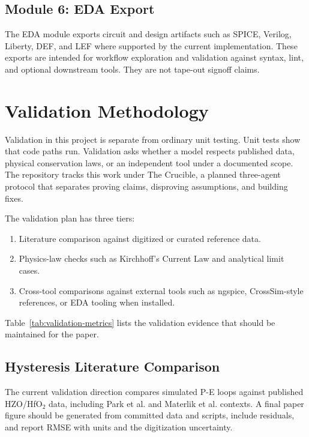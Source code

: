 \documentclass[11pt]{article}
\begin{document}
\subsection{Module 6: EDA Export}

The EDA module exports circuit and design artifacts such as SPICE, Verilog, Liberty, DEF, and LEF where supported by the current implementation. These exports are intended for workflow exploration and validation against syntax, lint, and optional downstream tools. They are not tape-out signoff claims.

\section{Validation Methodology}

Validation in this project is separate from ordinary unit testing. Unit tests show that code paths run. Validation asks whether a model respects published data, physical conservation laws, or an independent tool under a documented scope. The repository tracks this work under The Crucible, a planned three-agent protocol that separates proving claims, disproving assumptions, and building fixes.

The validation plan has three tiers:

\begin{enumerate}
  \item Literature comparison against digitized or curated reference data.
  \item Physics-law checks such as Kirchhoff's Current Law and analytical limit cases.
  \item Cross-tool comparisons against external tools such as ngspice, CrossSim-style references, or EDA tooling when installed.
\end{enumerate}

Table~\ref{tab:validation-metrics} lists the validation evidence that should be maintained for the paper.



\subsection{Hysteresis Literature Comparison}

The current validation direction compares simulated P-E loops against published HZO/HfO$_2$ data, including Park et al. \citep{park2015} and Materlik et al. \citep{materlik2015} contexts. A final paper figure should be generated from committed data and scripts, include residuals, and report RMSE with units and the digitization uncertainty.
\end{document}

